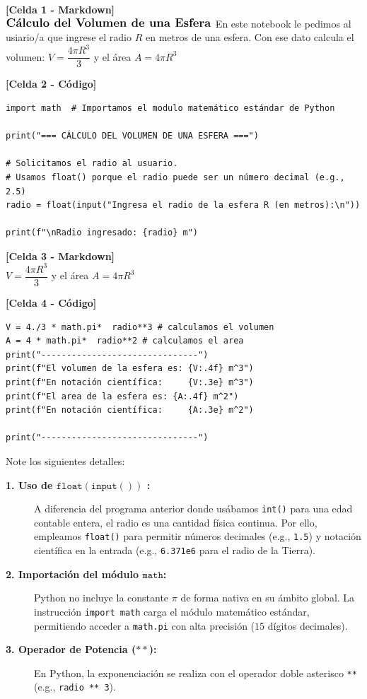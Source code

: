 \documentclass[12pt]{article}
\begin{document}
\noindent \textbf{[Celda 1 - Markdown]} \\
$\large{\textbf{Cálculo del Volumen de una Esfera}} \\$
En este notebook le pedimos al usiario/a que ingrese el radio $R$ en metros de una esfera. 
Con ese dato calcula el volumen: $V = \dfrac{4\pi R^3}{3}$ y el área $A = 4\pi R^3$


\noindent \textbf{[Celda 2 - Código]} 
\begin{lstlisting}
import math  # Importamos el modulo matemático estándar de Python

print("=== CÁLCULO DEL VOLUMEN DE UNA ESFERA ===")

# Solicitamos el radio al usuario. 
# Usamos float() porque el radio puede ser un número decimal (e.g., 2.5)
radio = float(input("Ingresa el radio de la esfera R (en metros):\n"))

print(f"\nRadio ingresado: {radio} m")
\end{lstlisting}

\noindent \textbf{[Celda 3 - Markdown]} \\
$V = \dfrac{4\pi R^3}{3}$ y el área $A = 4\pi R^3$


\noindent \textbf{[Celda 4 - Código]} 
\begin{lstlisting}
V = 4./3 * math.pi*  radio**3 # calculamos el volumen
A = 4 * math.pi*  radio**2 # calculamos el area
print("-------------------------------")
print(f"El volumen de la esfera es: {V:.4f} m^3")
print(f"En notación científica:     {V:.3e} m^3")
print(f"El area de la esfera es: {A:.4f} m^2")
print(f"En notación científica:     {A:.3e} m^2")

print("-------------------------------")
\end{lstlisting}

\noindent Note los siguientes detalles:

\begin{description}
    \item[\textbf{1. Uso de $\mathtt{float(input())}$ :}]
    A diferencia del programa anterior donde usábamos \lstinline|int()| para una edad 
    contable entera, el radio es una cantidad física continua. 
    Por ello, empleamos \lstinline|float()| para permitir números 
    decimales (e.g., \lstinline|1.5|) y notación científica en la 
    entrada (e.g., \lstinline|6.371e6| para el radio de la Tierra).

    \item[\textbf{2. Importación del módulo $\mathtt{math}$:}]
    Python no incluye la constante $\pi$ de forma nativa en su ámbito global. 
    La instrucción \lstinline|import math| carga el módulo matemático estándar, 
    permitiendo acceder a \lstinline|math.pi| con alta precisión ($15$ dígitos decimales).

    \item[\textbf{3. Operador de Potencia ($\mathtt{**}$):}]
    En Python, la exponenciación se realiza con el operador doble 
    asterisco \lstinline|**| (e.g., \lstinline|radio ** 3|). 
\end{description}
\end{document}
